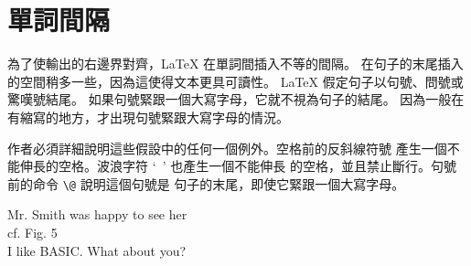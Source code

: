 
\section{單詞間隔}

為了使輸出的右邊界對齊，\LaTeX{} 在單詞間插入不等的間隔。
在句子的末尾插入的空間稍多一些，因為這使得文本更具可讀性。
\LaTeX{} 假定句子以句號、問號或驚嘆號結尾。
如果句號緊跟一個大寫字母，它就不視為句子的結尾。
因為一般在有縮寫的地方，才出現句號緊跟大寫字母的情況。

作者必須詳細說明這些假設中的任何一個例外。空格前的反斜線符號
產生一個不能伸長的空格。波浪字符 `\verb| |' 也產生一個不能伸長
的空格，並且禁止斷行。句號前的命令 \verb|\@| 說明這個句號是
句子的末尾，即使它緊跟一個大寫字母。 
 


\begin{example}
Mr. Smith was happy to see her\\
cf. Fig. 5\\
I like BASIC\@. What about you?
\end{example}

